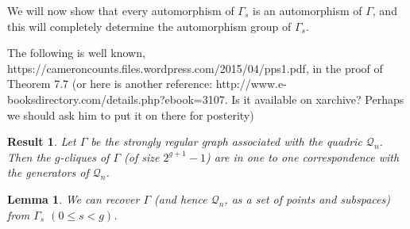 \documentclass[12pt]{article}
\newtheorem{lemma}[theorem]{Lemma}
\newtheorem{result}[theorem]{Result}
\newenvironment{proof}{\noindent{\bf Proof}\hspace{0.5em}}
    { \null  \hfill $\square$ \par}
\newcommand{\Q}{\mathscr Q}
\newcommand{\Label}{\label}
\newcommand\red[1]{{\color{red} #1}}
\begin{document}
We will now show that every automorphism of $\Gamma_s$ is an automorphism of $\Gamma$, and this will completely determine the automorphism group of $\Gamma_s$.

\red{The following is well known, https://cameroncounts.files.wordpress.com/2015/04/pps1.pdf, in the proof of Theorem 7.7 (or here is another reference: http://www.e-booksdirectory.com/details.php?ebook=3107.   Is it available on xarchive? Perhaps we should ask him to put it on there for posterity)}
\begin{result}\Label{res:gens}
Let $\Gamma$ be the strongly regular graph associated with the quadric $\Q_n$.  Then the $g$-cliques of $\Gamma$ (of size $2^{g+1}-1$) are in one to one correspondence with the generators of $\Q_n$.
\end{result} 




\begin{lemma}
We can recover $\Gamma$ (and hence $\Q_n$, as a set of points and subspaces) from $\Gamma_s$ $(0\le s <g)$.  
\end{lemma}
\end{document}
